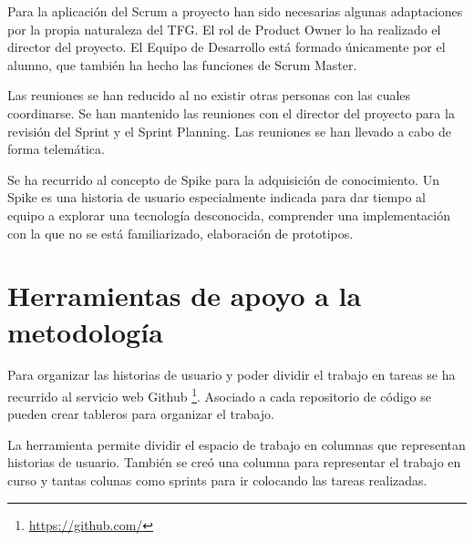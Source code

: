 Para la aplicación del Scrum a proyecto han sido necesarias algunas adaptaciones por la propia naturaleza del TFG. El rol de Product Owner lo ha realizado el director del proyecto. El Equipo de Desarrollo está formado únicamente por el alumno, que también ha hecho las funciones de Scrum Master.

Las reuniones se han reducido al no existir otras personas con las cuales coordinarse. Se han mantenido las reuniones con el director del proyecto para la revisión del Sprint y el Sprint Planning. Las reuniones se han llevado a cabo de forma telemática.

Se ha recurrido al concepto de Spike para la adquisición de conocimiento. Un Spike es una historia de usuario especialmente indicada para dar tiempo al equipo a explorar una tecnología desconocida, comprender una implementación con la que no se está familiarizado, elaboración de prototipos.

\section{Herramientas de apoyo a la metodología}

Para organizar las historias de usuario y poder dividir el trabajo en tareas se ha recurrido al servicio web Github \footnote{\url{https://github.com/}}. Asociado a cada repositorio de código se pueden crear tableros para organizar el trabajo.

La herramienta permite dividir el espacio de trabajo en columnas que representan historias de usuario. También se creó una columna para representar el trabajo en curso y tantas colunas como sprints para ir colocando las tareas realizadas.









